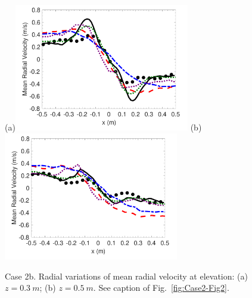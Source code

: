 \begin{figure}
\centering
(a)\includegraphics[height=2.2in]{Figures/Case2-Fig3a.pdf}
(b)\includegraphics[height=2.2in]{Figures/Case2-Fig3b.pdf}
\caption{Case 2b. Radial variations of mean radial velocity at elevation: (a) $z = 0.3~m$; (b) $z = 0.5~m$. See caption of Fig.~\ref{fig:Case2-Fig2}.}
\label{fig:Case2-Fig3}
\end{figure}


